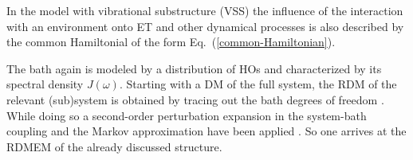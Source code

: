 \documentclass[12pt,twoside,a4paper]{report}
\begin{document}
In the model with vibrational substructure (VSS)
the influence of the interaction with an environment onto
ET and other dynamical processes is also 
described by the common Hamiltonial of the 
form Eq.~(\ref{common-Hamiltonian}).

The bath again is modeled
by a distribution of HOs and characterized by its
spectral density $J(\omega)$.  Starting with a DM of the
full system, the RDM of the relevant (sub)system is
obtained by tracing out the bath degrees of freedom \cite{blum96}.
While doing so a second-order perturbation expansion in the
system-bath coupling and the Markov approximation have been applied
\cite{blum96}. 
So one arrives at the RDMEM of the already discussed structure.
\end{document}
